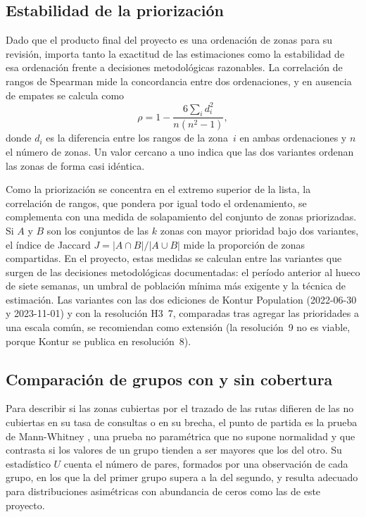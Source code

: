 \subsection{Estabilidad de la priorización}
\label{subsec:estabilidad-priorizacion}

Dado que el producto final del proyecto es una ordenación de zonas para su revisión, importa
tanto la exactitud de las estimaciones como la estabilidad de esa ordenación frente a
decisiones metodológicas razonables. La correlación de rangos de Spearman
\parencite{spearman1904} mide la concordancia entre dos ordenaciones, y en ausencia de
empates se calcula como
\[
  \rho = 1 - \frac{6 \sum_i d_i^2}{n(n^2 - 1)},
\]
donde $d_i$ es la diferencia entre los rangos de la zona~$i$ en ambas ordenaciones y $n$ el
número de zonas. Un valor cercano a uno indica que las dos variantes ordenan las zonas de
forma casi idéntica.

Como la priorización se concentra en el extremo superior de la lista, la correlación de
rangos, que pondera por igual todo el ordenamiento, se complementa con una medida de
solapamiento del conjunto de zonas priorizadas. Si $A$ y $B$ son los conjuntos de las $k$
zonas con mayor prioridad bajo dos variantes, el índice de Jaccard
$J = \lvert A \cap B \rvert / \lvert A \cup B \rvert$ mide la proporción de zonas
compartidas. En el proyecto, estas medidas se calculan entre las variantes que surgen de las
decisiones metodológicas documentadas: el período anterior al hueco de siete semanas, un
umbral de población mínima más exigente y la técnica de estimación. Las variantes con las
dos ediciones de Kontur Population (2022-06-30 y 2023-11-01) y con la resolución H3~7,
comparadas tras agregar las prioridades a una escala común, se recomiendan como extensión
(la resolución~9 no es viable, porque Kontur se publica en resolución~8).

\subsection{Comparación de grupos con y sin cobertura}
\label{subsec:comparacion-cobertura}

Para describir si las zonas cubiertas por el trazado de las rutas difieren de las no
cubiertas en su tasa de consultas o en su brecha, el punto de partida es la prueba de
Mann-Whitney \parencite{mann1947}, una prueba no paramétrica que no supone normalidad y que contrasta si
los valores de un grupo tienden a ser mayores que los del otro. Su estadístico $U$ cuenta el
número de pares, formados por una observación de cada grupo, en los que la del primer grupo
supera a la del segundo, y resulta adecuado para distribuciones asimétricas con abundancia de
ceros como las de este proyecto.

